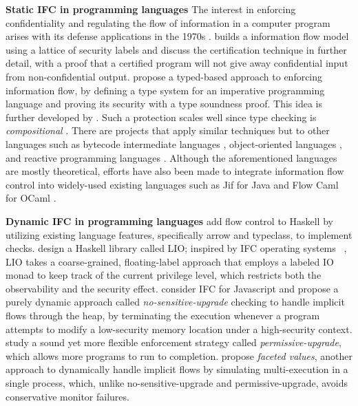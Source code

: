 \textbf{Static IFC in programming languages} The interest in enforcing
confidentiality and regulating the flow of information in a computer program
arises with its defense applications in the 1970s \autocite{bell1976secure}.
\textcite{denning1976lattice} builds a information flow model using a lattice of
security labels and \textcite{denning1977certification} discuss the
certification technique in further detail, with a proof that a certified program
will not give away confidential input from non-confidential output.
\textcite{volpano1996sound} propose a typed-based approach to enforcing
information flow, by defining a type system for an imperative programming
language and proving its security with a type soundness proof. This idea is
further developed by \textcite{zdancewic2002programming}. Such a protection
scales well since type checking is \textit{compositional}
\parencite{sabelfeld2003language}. There are projects that apply similar
techniques but to other languages such as bytecode intermediate languages
\autocite{barthe2005non}, object-oriented languages \autocite{amtoft2006logic},
and reactive programming languages \autocite{bohannon2009reactive}. Although the
aforementioned languages are mostly theoretical, efforts have also been made to
integrate information flow control into widely-used existing languages such as
Jif for Java \autocite{myers1999jflow} and Flow Caml for OCaml
\autocite{pottier2002information, simonet2003flow}.

\textbf{Dynamic IFC in programming languages}
\textcite{li2006encoding,LI20101974} add flow control to Haskell by utilizing
existing language features, specifically arrow and typeclass, to implement
checks. \textcite{stefan2011flexible,stefan2012flexible,STEFAN:2017ta} design a
Haskell library called LIO; inspired by IFC operating systems
~\parencite{efstathopoulos2005labels,zeldovich2011making,krohn2007information,vandebogart2007labels},
LIO takes a coarse-grained, floating-label approach that employs a labeled IO
monad to keep track of the current privilege level, which restricts both the
observability and the security effect. \textcite{austin2009efficient} consider
IFC for Javascript and propose a purely dynamic approach called
\textit{no-sensitive-upgrade} checking to handle implicit flows through the
heap, by terminating the execution whenever a program attempts to modify a
low-security memory location under a high-security context.
\textcite{austin2010permissive} study a sound yet more flexible enforcement
strategy called \textit{permissive-upgrade}, which allows more programs to run
to completion. \textcite{austin2012multiple,Austin:2017uh} propose
\textit{faceted values}, another approach to dynamically handle implicit flows
by simulating multi-execution in a single process, which, unlike
no-sensitive-upgrade and permissive-upgrade, avoids conservative monitor
failures.

